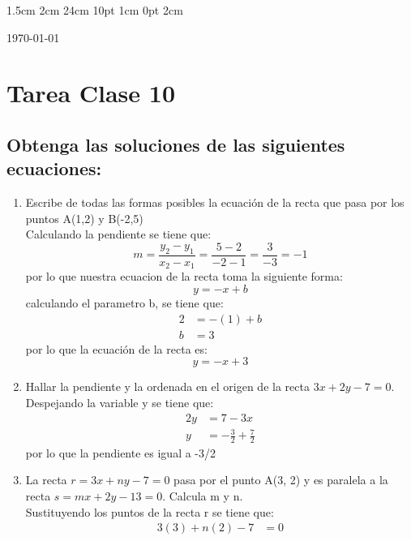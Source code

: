\documentclass[12pt,letterpaper]{report}
\begin{document}
\setmargins{2.5cm}      
{1.5cm}                     
{2cm}  
{24cm}                    
{10pt}                          
{1cm}                          
{0pt}                             
{2cm}
\begin{flushright}
\today
\end{flushright}
\vspace{-1.75cm}
\section*{Tarea Clase 10}
\subsection*{Obtenga las soluciones de las siguientes ecuaciones:}
\begin{enumerate}
\item Escribe de todas las formas posibles la ecuación de la recta que pasa por los puntos A(1,2) y B(-2,5)\\
Calculando la pendiente se tiene que:
\begin{equation*}
    m=\frac{y_2-y_1}{x_2-x_1}=\frac{5-2}{-2-1}= \frac{3}{-3}=-1
\end{equation*}
por lo que nuestra ecuacion de la recta toma la siguiente forma:
\begin{equation*}
    y=-x+b
\end{equation*}
calculando el parametro b, se tiene que:
\begin{align*}
    2&=-(1)+b\\
    b&=3
\end{align*}
por lo que la ecuación de la recta es:
\begin{equation*}
    y=-x+3
\end{equation*}
\item Hallar la pendiente y la ordenada en el origen de la recta $3x+2y-7=0$.\\
Despejando la variable y se tiene que:
\begin{align*}
    2y&=7-3x\\
    y&=-\frac{3}{2}+\frac{7}{2}
\end{align*}
por lo que la pendiente es igual a -3/2
\item La recta $r=3x+ny-7=0$ pasa por el punto A(3, 2) y es paralela a la recta $s=mx+2y-13=0$. Calcula m y n.\\
Sustituyendo los puntos de la recta r se tiene que:
\begin{align*}
    3(3)+n(2)-7&=0\\

\end{align*}
\end{enumerate}
\end{document}
